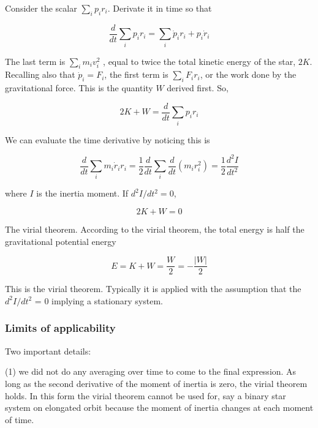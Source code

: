 Consider the scalar $\sum_i p_i r_i$. Derivate it in time so that 

\begin{equation}
\frac{d}{dt} \sum_i p_i r_i = \sum_i \dot{p}_i r_i + p_i \dot{r}_i
\end{equation}

The last term is $\sum_i m_i v^2_i$ , equal to twice the total kinetic
energy of the star, $2K$. Recalling also that $\dot{p}_i = F_i$, the
first term is $\sum_i F_i r_i$, or the work done by the
gravitational force. This is the quantity $W$ derived first. So, 

\begin{equation}
2K + W = \frac{d}{dt}\sum_i p_i r_i 
\end{equation}

We can evaluate the time derivative by noticing this is 

\begin{equation}
\frac{d}{dt}\sum_i m_i \dot{r}_i r_i = \frac{1}{2}\frac{d}{dt}\sum_i
\frac{d}{dt} \left( m_i r_i^2\right) = \frac{1}{2}\frac{d^2 I}{dt^2}
\end{equation}

where $I$ is the inertia moment. If $d^2I/dt^2=0$, 

\begin{equation}
2K + W = 0 
\label{eq:virial}
\end{equation}

The virial theorem. According to the virial theorem, the total energy
is half the gravitational potential energy


\begin{equation}
E = K + W = \frac{W}{2} = -\frac{|W|}{2}
\end{equation}


This is the virial theorem. Typically it is applied with the assumption that the $d^2I/dt^2$ = 0
implying a stationary system.


\subsubsection{Limits of applicability}

Two important details: 

(1) we did not do any averaging over time to come to the final expression. As long as the second derivative of the moment of inertia is zero, the virial theorem holds. In this form the virial theorem cannot be used for, say a binary star system on elongated orbit because the moment of inertia changes at each moment of time. 

